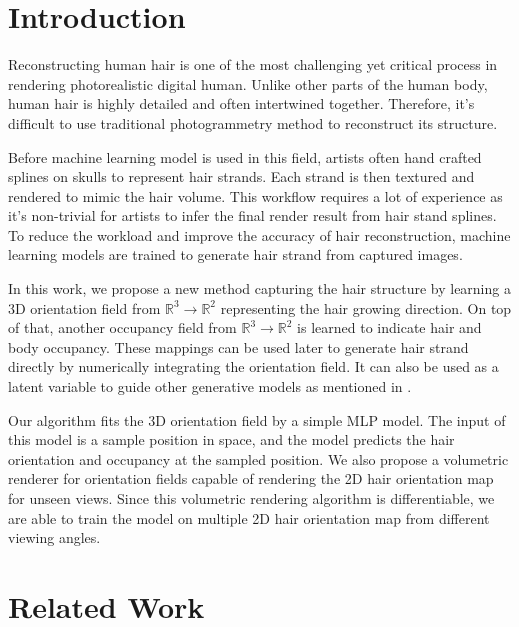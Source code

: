 \documentclass{article}
\begin{document}
\section{Introduction}


Reconstructing human hair is one of the most challenging yet critical process in rendering photorealistic digital human. Unlike other parts of the human body, human hair is highly detailed and often intertwined together. Therefore, it's difficult to use traditional photogrammetry method to reconstruct its structure.

Before machine learning model is used in this field, artists often hand crafted splines on skulls to represent hair strands. Each strand is then textured and rendered to mimic the hair volume. This workflow requires a lot of experience as it's non-trivial for artists to infer the final render result from hair stand splines. To reduce the workload and improve the accuracy of hair reconstruction, machine learning models are trained to generate hair strand from captured images.

In this work, we propose a new method capturing the hair structure by learning a 3D orientation field from $\mathbb{R}^{3} \rightarrow \mathbb{R}^{2}$ representing the hair growing direction. On top of that, another occupancy field from $\mathbb{R}^{3} \rightarrow \mathbb{R}^{2}$ is learned to indicate hair and body occupancy. These mappings can be used later to generate hair strand directly by numerically integrating the orientation field. It can also be used as a latent variable to guide other generative models as mentioned in \cite{metzer_latent-nerf_2022}.


Our algorithm fits the 3D orientation field by a simple MLP model. The input of this model is a sample position in space, and the model predicts the hair orientation and occupancy at the sampled position. We also propose a volumetric renderer for orientation fields capable of rendering the 2D hair orientation map for unseen views. Since this volumetric rendering algorithm is differentiable, we are able to train the model on multiple 2D hair orientation map from different viewing angles.

\section{Related Work}
\end{document}
